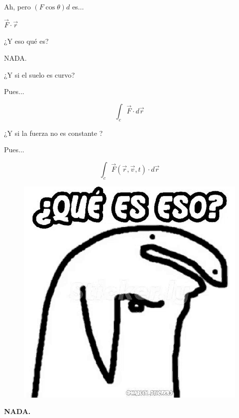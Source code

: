 \begin{frame}
    \begin{center}
        Ah, pero $(F\cos\theta)d$ es...
    \end{center}

    \begin{center}
        \pause \Large $\vec{F}\cdot\vec{r}$
        
        \pause \large ¿Y eso qué es?
        
        \vspace{2em} \pause \Huge NADA.
    \end{center}
\end{frame}

\begin{frame}
\begin{center}
    ¿Y si el suelo es curvo?
    
    \pause Pues...

    \begin{equation*}
        \int_c\vec{F}\cdot d\vec{r}
    \end{equation*}

    \pause ¿Y si la fuerza no es constante ?
    
    \pause Pues...

    \begin{equation*}
        \int_c\vec{F}(\vec{r},\vec{v},t)\cdot d\vec{r}
    \end{equation*}

    \end{center}
    
\end{frame}

\begin{frame}
    \begin{figure}
        \centering
        \includegraphics[width=0.4\linewidth]{figures/meme-que-es.png}
    \end{figure}
    
    \begin{center}
        \vspace{3em} \pause \Huge \textbf{NADA.}
    \end{center}
\end{frame}

